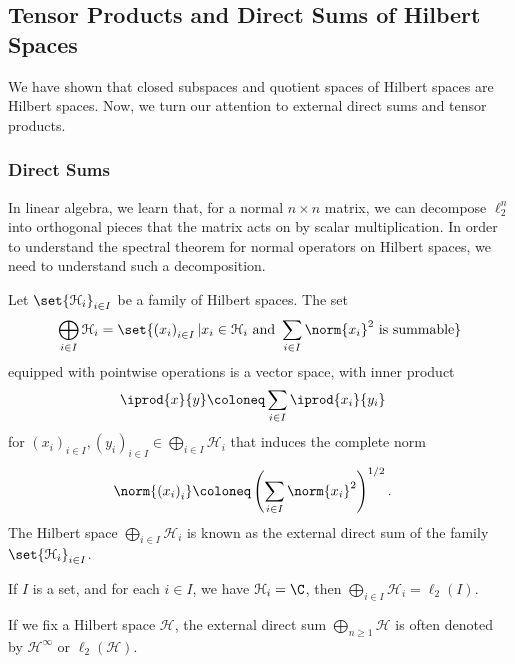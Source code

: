 \documentclass[10pt]{mypackage}
\begin{document}
\subsection{Tensor Products and Direct Sums of Hilbert Spaces}%
We have shown that closed subspaces and quotient spaces of Hilbert spaces are Hilbert spaces. Now, we turn our attention to external direct sums and tensor products.
\subsubsection{Direct Sums}%
In linear algebra, we learn that, for a normal $n\times n$ matrix, we can decompose $\ell_2^{n}$ into orthogonal pieces that the matrix acts on by scalar multiplication. In order to understand the spectral theorem for normal operators on Hilbert spaces, we need to understand such a decomposition.
\begin{proposition}
  Let $\set{\mathcal{H}_i}_{i\in I}$ be a family of Hilbert spaces. The set
  \begin{align*}
    \bigoplus_{i\in I}\mathcal{H}_i = \set{\left(x_i\right)_{i\in I} | x_i\in \mathcal{H}_i\text{ and } \sum_{i\in I}\norm{x_i}^2\text{ is summable}}
  \end{align*}
  equipped with pointwise operations is a vector space, with inner product
  \begin{align*}
    \iprod{x}{y} &\coloneq \sum_{i\in I} \iprod{x_i}{y_i}
  \end{align*}
  for $\left(x_i\right)_{i\in I},\left(y_i\right)_{i\in I}\in \bigoplus_{i\in I}\mathcal{H}_i$ that induces the complete norm
  \begin{align*}
    \norm{\left(x_i\right)_i} &\coloneq \left(\sum_{i\in I}\norm{x_i}^2\right)^{1/2}.
  \end{align*}
    The Hilbert space $\bigoplus_{i\in I}\mathcal{H}_i$ is known as the external direct sum of the family $\set{\mathcal{H}_i}_{i\in I}$.
\end{proposition}
\begin{example}
  If $I$ is a set, and for each $i\in I$, we have $\mathcal{H}_{i} = \C$, then $\bigoplus_{i\in I}\mathcal{H}_{i} = \ell_2\left(I\right)$.
\end{example}
\begin{example}
  If we fix a Hilbert space $\mathcal{H}$, the external direct sum $\bigoplus_{n\geq 1}\mathcal{H}$ is often denoted by $\mathcal{H}^{\infty}$ or $\ell_2\left(\mathcal{H}\right)$.
\end{example}
\end{document}
